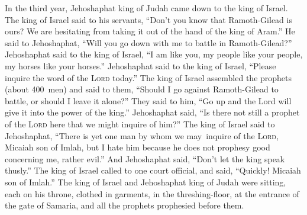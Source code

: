 \begin{inparaenum}
     In the third year, Jehoshaphat king of Judah came down to the king of Israel.%
     The king of Israel said to his servants, ``Don't you know that Ramoth-Gilead is ours? We are hesitating from taking it out of the hand of the king of Aram.''%
     He said to Jehoshaphat, ``Will you go down with me to battle in Ramoth-Gilead?'' Jehoshaphat said to the king of Israel, ``I am like you, my people like your people, my horses like your horses.''%
     Jehoshaphat said to the king of Israel, ``Please inquire the word of the \textsc{Lord} today.''%
     The king of Israel assembled the prophets (about 400~men) and said to them, ``Should I go against Ramoth-Gilead to battle, or should I leave it alone?'' They said to him, ``Go up and the Lord will give it into the power of the king.''%
     Jehoshaphat said, ``Is there not still a prophet of the \textsc{Lord} here that we might inquire of him?''%
     The king of Israel said to Jehoshaphat, ``There is yet one man by whom we may\understood\ inquire of the \textsc{Lord}, Micaiah son of Imlah, but I hate him because he does not prophesy good concerning me, rather evil.'' And Jehoshaphat said, ``Don't let the king speak thusly.''%
     The king of Israel called to one court official, and said, ``Quickly! Micaiah son of Imlah.''%
     The king of Israel and Jehoshaphat king of Judah were sitting, each on his throne, clothed in garments, in the threshing-floor, at the entrance of the gate of Samaria, and all the prophets prophesied before them.%

\end{inparaenum}
